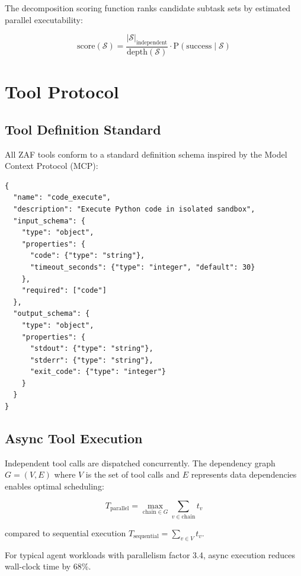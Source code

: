 \documentclass[11pt,a4paper]{article}
\begin{document}
The decomposition scoring function ranks candidate subtask sets by estimated parallel executability:

\begin{equation}
\text{score}(\mathcal{S}) = \frac{|\mathcal{S}|_{\text{independent}}}{\text{depth}(\mathcal{S})} \cdot \text{P}(\text{success} \mid \mathcal{S})
\end{equation}

\section{Tool Protocol}

\subsection{Tool Definition Standard}

All ZAF tools conform to a standard definition schema inspired by the Model Context Protocol (MCP):

\begin{verbatim}
{
  "name": "code_execute",
  "description": "Execute Python code in isolated sandbox",
  "input_schema": {
    "type": "object",
    "properties": {
      "code": {"type": "string"},
      "timeout_seconds": {"type": "integer", "default": 30}
    },
    "required": ["code"]
  },
  "output_schema": {
    "type": "object",
    "properties": {
      "stdout": {"type": "string"},
      "stderr": {"type": "string"},
      "exit_code": {"type": "integer"}
    }
  }
}
\end{verbatim}

\subsection{Async Tool Execution}

Independent tool calls are dispatched concurrently. The dependency graph $G = (V, E)$ where $V$ is the set of tool calls and $E$ represents data dependencies enables optimal scheduling:

\begin{equation}
T_{\text{parallel}} = \max_{\text{chain} \in G} \sum_{v \in \text{chain}} t_v
\end{equation}

compared to sequential execution $T_{\text{sequential}} = \sum_{v \in V} t_v$.

For typical agent workloads with parallelism factor 3.4, async execution reduces wall-clock time by 68\%.
\end{document}

